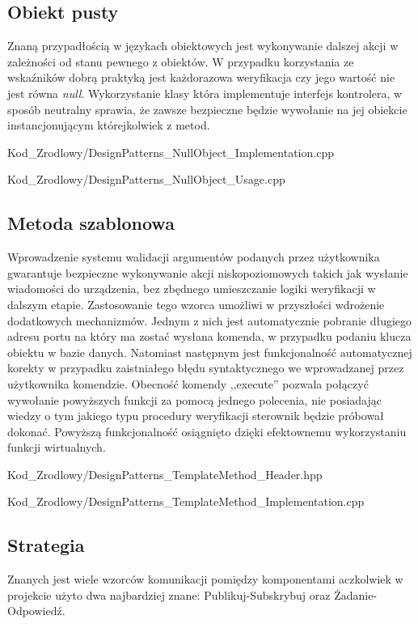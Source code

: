     \subsection{Obiekt pusty}
        Znaną przypadłością w językach obiektowych jest wykonywanie dalszej akcji w zależności od stanu pewnego z obiektów.
        W przypadku korzystania ze wskaźników dobrą praktyką jest każdorazowa weryfikacja czy jego wartość nie jest równa \textit{null}.
        Wykorzystanie klasy która implementuje interfejs kontrolera, w sposób neutralny sprawia, że zawsze bezpieczne będzie wywołanie na jej obiekcie 
        instancjonującym którejkolwiek z metod.
        
            {Kod_Zrodlowy/DesignPatterns_NullObject_Implementation.cpp}
        
            {Kod_Zrodlowy/DesignPatterns_NullObject_Usage.cpp}
    \newpage
    \subsection{Metoda szablonowa}
        Wprowadzenie systemu walidacji argumentów podanych przez użytkownika gwarantuje bezpieczne wykonywanie akcji niskopoziomowych takich
        jak wysłanie wiadomości do urządzenia, bez zbędnego umieszczanie logiki weryfikacji w dalszym etapie. Zastosowanie tego wzorca umożliwi w przyszłości wdrożenie dodatkowych mechanizmów.
        Jednym z nich jest automatycznie pobranie długiego adresu portu na który ma zostać wysłana komenda, w przypadku podaniu klucza obiektu w bazie danych. 
        Natomiast następnym jest funkcjonalność automatycznej korekty w przypadku zaistniałego błędu syntaktycznego we wprowadzanej przez użytkownika komendzie.
        Obecność komendy ,,execute'' pozwala połączyć wywołanie powyższych funkcji za pomocą jednego polecenia,
        nie posiadając wiedzy o tym jakiego typu procedury weryfikacji sterownik będzie próbował dokonać. Powyższą funkcjonalność osiągnięto dzięki efektownemu wykorzystaniu
        funkcji wirtualnych.
        
            {Kod_Zrodlowy/DesignPatterns_TemplateMethod_Header.hpp}
        
            {Kod_Zrodlowy/DesignPatterns_TemplateMethod_Implementation.cpp}
    \subsection{Strategia}
        Znanych jest wiele wzorców komunikacji pomiędzy komponentami aczkolwiek w projekcie użyto dwa najbardziej znane: Publikuj-Subskrybuj oraz Żadanie-Odpowiedź.
        
